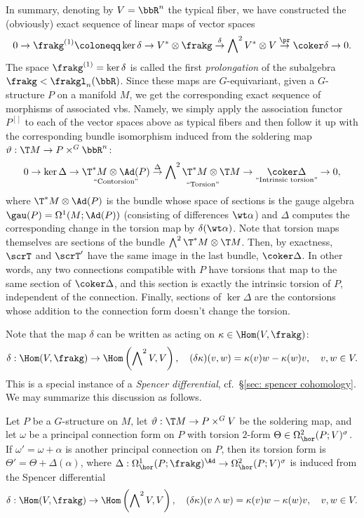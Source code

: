 In summary, denoting by $V=\bbR^n$ the typical fiber, we have constructed the (obviously) exact sequence of linear maps of vector spaces
\[0\to\frakg^{(1)}\coloneqq\ker\delta\to V^\ast\otimes\frakg\overset{\delta}{\to}\bigwedge\nolimits^2 V^\ast \otimes V\overset{\pr}{\to}\coker\delta\to 0.\]
The space $\frakg^{(1)}=\ker\delta$ is called the first \emph{prolongation} of the subalgebra $\frakg<\frakgl_n(\bbR)$. Since these maps are $G$-equivariant, given a $G$-structure $P$ on a manifold $M$, we get the corresponding exact sequence of morphisms of associated \glspl{vb}. Namely, we simply apply the association functor $P^{[]}$ to each of the vector spaces above as typical fibers and then follow it up with the corresponding bundle isomorphism induced from the soldering map $\vartheta:\T M\to P\times^G \bbR^n$:
\[ 0\to \ker \Delta \to \underset{\text{``Contorsion''}}{\T^\ast M\otimes \Ad(P)}\overset{\Delta}{\to} \underset{\text{``Torsion''}}{\bigwedge\nolimits^2 \T^\ast M\otimes \T M}\to \underset{\text{``Intrinsic torsion''}}{\coker \Delta}\to 0,\]
where $ \T^\ast M\otimes \Ad(P)$ is the bundle whose space of sections is the gauge algebra $\gau(P)=\Omega^1(M;\Ad(P))$ (consisting of differences $\wt\alpha$) and $\Delta$ computes  the corresponding change in the torsion map by $\delta(\wt\alpha)$. Note that torsion maps themselves are sections of the bundle $\bigwedge\nolimits^2 \T^\ast M\otimes \T M$. Then, by exactness, $\scrT$ and $\scrT'$ have the same image in the last bundle, $\coker\Delta$. In other words, any two connections compatible with $P$ have torsions that map to the same section of $\coker\Delta$, and this section is exactly the intrinsic torsion of $P$, independent of the connection. Finally, sections of $\ker\Delta$ are the contorsions whose addition to the connection form doesn't change the torsion.

Note that the map $\delta$ can be written as acting on $\kappa\in\Hom(V,\frakg)$:
\[\delta:\Hom(V,\frakg)\to \Hom\left(\bigwedge\nolimits^2 V,V\right),\quad (\delta\kappa)(v,w)=\kappa(v) w-\kappa(w) v,\quad v,w\in V.\]
This is a special instance  of a \emph{Spencer differential}, cf.~\S\ref{sec: spencer cohomology}. We may summarize this discussion as follows.

\begin{prop}
    Let $P$ be a $G$-structure on $M$, let $\vartheta:\T M\to P\times^G V$ be the soldering map, and let $\omega$ be a principal connection form on $P$ with torsion $2$-form $\Theta\in\Omega^2_{\hor}(P;V)^\sigma$. If $\omega'=\omega+\alpha$ is another principal connection on $P$, then its torsion form is $\Theta'=\Theta+\Delta(\alpha)$, where $\Delta:\Omega^1_{\hor}(P;\frakg)^\Ad\to \Omega^2_{\hor}(P;V)^\sigma$ is induced from the Spencer differential 
    \[\delta:\Hom(V,\frakg)\to \Hom\left(\bigwedge\nolimits^2 V,V\right),\quad (\delta\kappa) (v\wedge w)=\kappa(v)w-\kappa(w)v,\quad v,w\in V.\]
\end{prop}

